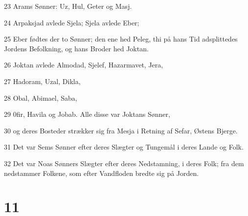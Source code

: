 \par 23 Arams Sønner: Uz, Hul, Geter og Masj.
\par 24 Arpaksjad avlede Sjela; Sjela avlede Eber;
\par 25 Eber fødtes der to Sønner; den ene hed Peleg, thi på hans Tid adsplittedes Jordens Befolkning, og hans Broder hed Joktan.
\par 26 Joktan avlede Almodad, Sjelef, Hazarmavet, Jera,
\par 27 Hadoram, Uzal, Dikla,
\par 28 Obal, Abimael, Saba,
\par 29 0fir, Havila og Jobab. Alle disse var Joktans Sønner,
\par 30 og deres Bosteder strækker sig fra Mesja i Retning af Sefar, Østens Bjerge.
\par 31 Det var Sems Sønner efter deres Slægter og Tungemål i deres Lande og Folk.
\par 32 Det var Noas Sønners Slægter efter deres Nedstamning, i deres Folk; fra dem nedstammer Folkene, som efter Vandfloden bredte sig på Jorden.

\chapter{11}

